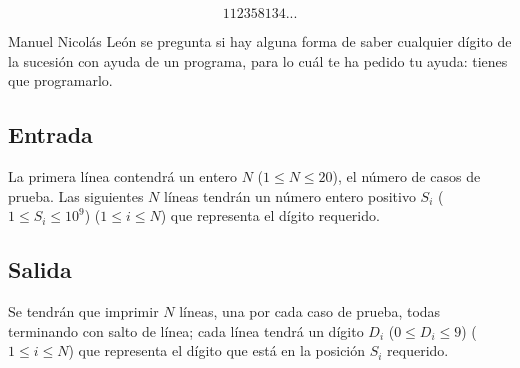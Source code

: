 \documentclass[letter,10pt]{article}
\begin{document}
$$112358134 ...$$

Manuel Nicolás León se pregunta si hay alguna forma de saber cualquier dígito de la sucesión con ayuda de un programa, para lo cuál te ha pedido tu ayuda: tienes que programarlo.


\subsection*{Entrada}

La primera línea contendrá un entero $N$ ($1 \le N \le 20$), el número de casos de prueba. Las siguientes $N$ líneas tendrán un número entero positivo $S_i$ ($1 \le S_i \le 10^9$) ($1 \le i \le N$) que representa el dígito requerido.

\subsection*{Salida}

Se tendrán que imprimir $N$ líneas, una por cada caso de prueba, todas terminando con salto de línea; cada línea tendrá un dígito $D_i$ ($0 \le D_i \le 9$) ($1 \le i \le N$) que representa el dígito que está en la posición $S_i$ requerido.

\end{document}
